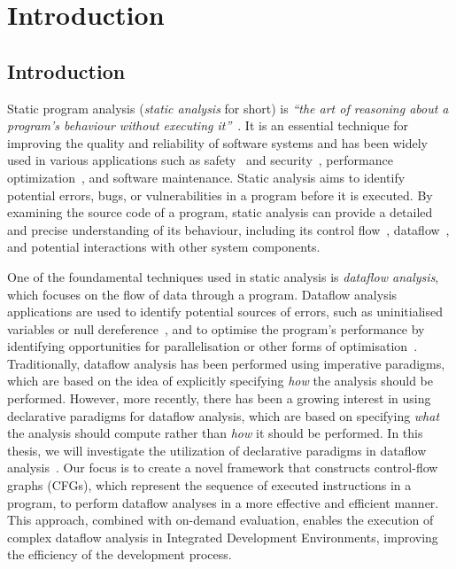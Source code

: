 \chapter{Introduction}
\section{Introduction}

Static program analysis (\emph{static analysis} for short) is
\emph{``the art of reasoning about a program's behaviour without executing it''}~\cite{spa}.
It is an essential technique for improving the quality and reliability of software
systems and has been widely used in various applications such
as safety~\cite{cousot2005astree,Blanchet2002} and security~\cite{piskachev2021secucheck,flowDroid,ayewah2008using,Sayar_2022,fink2012wala},
performance optimization~\cite{aho2007compilers,appel2004modern}, and software maintenance.
Static analysis aims to identify potential errors, bugs, or vulnerabilities
in a program before it is executed.
By examining the source code of a program, static
analysis can provide a detailed and precise understanding of its behaviour, including
its control flow~\cite{allen1970control}, dataflow~\cite{kam1977monotone},
and potential interactions with other system components.



One of the foundamental techniques used in static analysis is \emph{dataflow analysis},
which focuses on the flow of data through a program. Dataflow analysis applications are used to identify
potential sources of errors, such as uninitialised variables or null dereference~\cite{riouak2021precise,10.1016/j.scico.2012.02.002},
and to optimise the program's performance by identifying opportunities for
parallelisation or other forms of optimisation~\cite{aho2007compilers}.
Traditionally, dataflow analysis has been performed using imperative paradigms,
which are based on the idea of explicitly specifying \emph{how} the analysis should be
performed.
However, more recently, there has been a growing interest in using
declarative paradigms for dataflow analysis, which are based on specifying \emph{what}
the analysis should compute rather than \emph{how} it should be performed.
In this thesis, we will investigate the utilization of declarative paradigms in
dataflow analysis~\cite{smits2020flowspec,madsen2016programming}. Our focus is to
create a novel framework that constructs control-flow graphs (CFGs), which represent the
sequence of executed instructions in a program, to perform dataflow analyses in a
more effective and efficient manner. This approach, combined with on-demand evaluation,
enables the execution of complex dataflow analysis in Integrated Development Environments,
improving the efficiency of the development process.


